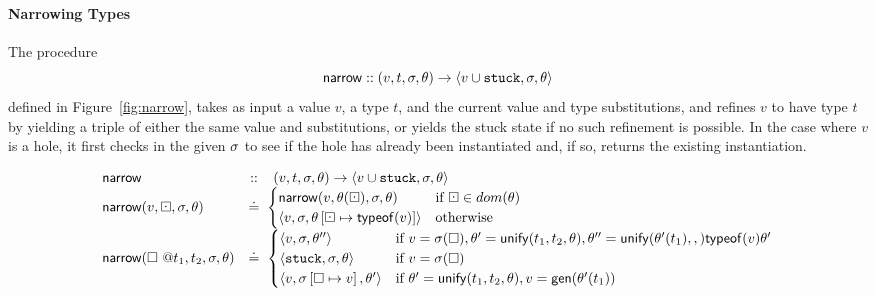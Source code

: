 \paragraph{Narrowing Types} The procedure %
$$
\forcesym :: (v, t, \vsu, \tsu) \rightarrow \triple{v \cup \stuck}{\vsu}{\tsu}
$$
defined in Figure~\ref{fig:narrow}, takes as input a value $v$, a type
$t$, and the current value and type substitutions, and refines $v$ to
have type $t$ by yielding a triple of either the same value and
substitutions, or yields the stuck state if no such refinement is
possible. In the case where $v$ is a hole, it first checks in the given
$\vsu$ to see if the hole has already been instantiated and, if so,
returns the existing instantiation.
%
\begin{figure*}[ht]
$$
\begin{array}{lcl}
\forcesym                  & ::     & (v, t, \vsu, \tsu) \rightarrow \triple{v \cup \stuck}{\vsu}{\tsu} \\
\force{v}{\thole}{\vsu}{\tsu}  & \defeq & \hspace{-1ex}
\begin{cases}
  \force{v}{\subst{\tsu}{\thole}}{\vsu}{\tsu} & \mbox{if}\ \thole \in dom(\tsu) \\
  \triple{v}{\vsu}{\extendsu{\tsu}{\thole}{\typeof{v}}} & \mbox{otherwise} \\
\end{cases} \\
\force{\vhole{t_1}}{t_2}{\vsu}{\tsu} & \defeq & \hspace{-1ex}
\begin{cases}
  \triple{v}{\vsu}{\tsu''}    & \mbox{if } v = \lookupsu{\vsu}{\ehole},
                                         \tsu' = \unify{t_1}{t_2}{\tsu},
                                         \tsu'' = \unify{\subst{\tsu'}{t_1}}
                                                        {\typeof{v}}{\tsu'} \\
  \triple{\stuck}{\vsu}{\tsu} & \mbox{if } v = \lookupsu{\vsu}{\ehole} \\
  \triple{v}{\extendsu{\vsu}{\ehole}{v}}{\tsu'} & \mbox{if}\ \tsu' = \unify{t_1}{t_2}{\tsu}, v = \gen{\subst{\tsu'}{t_1}}\\
\end{cases} \\

\end{array}$$
\end{figure*}
